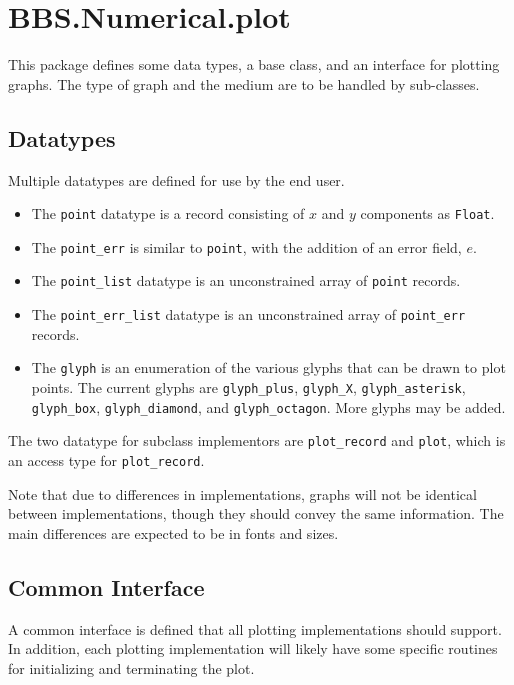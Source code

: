\documentclass[10pt, openany]{book}
\newcommand{\datatype}[1]{\texttt{#1}}
\begin{document}
\section{BBS.Numerical.plot}
This package defines some data types, a base class, and an interface for plotting graphs.  The type of graph and the medium are to be handled by sub-classes.

\subsection{Datatypes}
Multiple datatypes are defined for use by the end user.
\begin{itemize}
  \item The \datatype{point} datatype is a record consisting of $x$ and $y$ components as \datatype{Float}.
  \item The \datatype{point\_err} is similar to \datatype{point}, with the addition of an error field, $e$.
  \item The \datatype{point\_list} datatype is an unconstrained array of \datatype{point} records.
  \item The \datatype{point\_err\_list} datatype is an unconstrained array of \datatype{point\_err} records.
  \item The \datatype{glyph} is an enumeration of the various glyphs that can be drawn to plot points.  The current glyphs are \datatype{glyph\_plus}, \datatype{glyph\_X}, \datatype{glyph\_asterisk}, \datatype{glyph\_box}, \datatype{glyph\_diamond}, and \datatype{glyph\_octagon}.  More glyphs may be added.
\end{itemize}

The two datatype for subclass implementors are \datatype{plot\_record} and \datatype{plot}, which is an access type for \datatype{plot\_record}.

Note that due to differences in implementations, graphs will not be identical between implementations, though they should convey the same information.  The main differences are expected to be in fonts and sizes.

\subsection{Common Interface}
A common interface is defined that all plotting implementations should support.  In addition, each plotting implementation will likely have some specific routines for initializing and terminating the plot.
\end{document}

